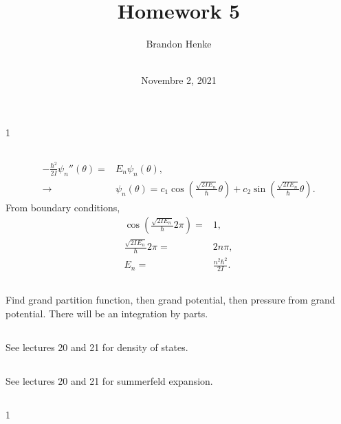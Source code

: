 \documentclass[a4paper,12pt,twoside]{article}
\title{Homework 5}
\author{
	Brandon Henke\\
	\textit{\course}\\
	\textit{\professor}
}
\date{Novembre 2, 2021}
\newcommand{\mcols}{0}
\begin{document}

\maketitle
\if\mcols1
\begin{multicols*}{2}
\fi

\setcounter{section}{5}
\subsection{}
\subsubsection{}
\begin{align}
	-\frac{\hbar^2}{2I}\psi_n''(\theta) =& E_n \psi_n(\theta),\\
	\rightarrow& \psi_n(\theta) = c_1 \cos(\frac{\sqrt{2IE_n}}{\hbar}\theta) + c_2 \sin(\frac{\sqrt{2IE_n}}{\hbar}\theta).
\end{align}
From boundary conditions,
\begin{align}
	\cos(\frac{\sqrt{2IE_n}}{\hbar}2\pi) =& 1,\\
	\frac{\sqrt{2IE_n}}{\hbar}2\pi =& 2n\pi,\\
	E_n =& \frac{n^2\hbar^2}{2I}.
\end{align}
\subsubsection{}


\subsection{}
Find grand partition function, then grand potential, then pressure from grand potential.
There will be an integration by parts.
\subsubsection{}
\subsubsection{}
\subsubsection{}
\subsection{}
See lectures 20 and 21 for density of states.
\subsection{}
See lectures 20 and 21 for summerfeld expansion.
\subsection{}

\printBib


\if\mcols1
\end{multicols*}
\fi
\end{document}
